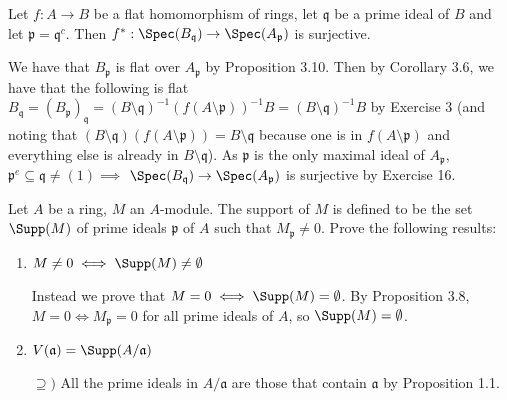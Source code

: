 \documentclass[a4paper]{exam}
\newif\ifhint
\begin{document}
\begin{questions}
\question Let $f: A\to B $ be a flat homomorphism of rings, let $\mathfrak{q} $ be a prime ideal of $B $ and let $\mathfrak{p} = \mathfrak{q}^c $. Then $f^\ast: \Spec(B_{\mathfrak{q}}) \to \Spec(A_{\mathfrak{p}}) $ is surjective.
\ifhint
	For $B_{\mathfrak{p}} $ is flat over $A_{\mathfrak{p}} $ by (3.10), and $B_{\mathfrak{q}} $ is a local ring of $B_{\mathfrak{p}} $, hence is flat over $B_{\mathfrak{p}} $. Hence $B_{\mathfrak{q}} $ is flat over $A_{\mathfrak{p}} $ and satisfies condition (3) of Exercise 16.
\fi
\begin{solution}
	We have that $B_{\mathfrak{p}} $ is flat over $A_{\mathfrak{p}} $ by Proposition 3.10.
	Then by Corollary 3.6, we have that the following is flat $B_{\mathfrak{q}} = (B_{\mathfrak{p}})_{\mathfrak{q}} = (B \setminus \mathfrak{q})^{-1} (f(A\setminus \mathfrak{p}))^{-1} B = (B \setminus \mathfrak{q})^{-1} B$ by Exercise 3 (and noting that $(B \setminus \mathfrak{q})(f(A \setminus \mathfrak{p})) = B\setminus \mathfrak{q}$ because one is in $f(A \setminus \mathfrak{p}) $ and everything else is already in $B \setminus \mathfrak{q} $).
	As $\mathfrak{p} $ is the only maximal ideal of $A_{\mathfrak{p}} $, $\mathfrak{p}^e \subseteq \mathfrak{q} \ne (1) \implies $ $\Spec(B_{\mathfrak{q}}) \to \Spec(A_{\mathfrak{p}}) $ is surjective by Exercise 16.
\end{solution}

\question Let $A $ be a ring, $M $ an $A $-module. The support of $M $ is defined to be the set $\Supp(M)$ of prime ideals $\mathfrak{p} $ of $A $ such that $M_{\mathfrak{p}}\ne 0 $. Prove the following results:
\begin{enumerate}
	\item $M\ne 0 \iff \Supp(M) \ne \emptyset $
	\begin{solution}
		Instead we prove that $M = 0 \iff \Supp(M) = \emptyset $.
		By Proposition 3.8, $M = 0 \iff M_{\mathfrak{p}} = 0 $ for all prime ideals of $A $, so $\Supp(M) = \emptyset $.
	\end{solution}
	\item $V(\mathfrak{a}) = \Supp(A / \mathfrak{a}) $
	\begin{solution}
		$\supseteq) $ All the prime ideals in $A / \mathfrak{a} $ are those that contain $\mathfrak{a} $ by Proposition 1.1.


\end{solution}
\end{enumerate}
\end{questions}
\end{document}
